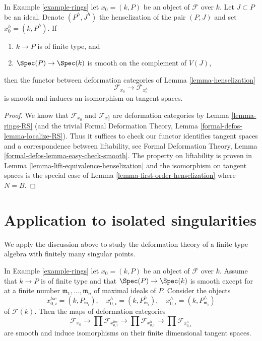 \begin{lemma}
\label{lemma-smooth-henselization}
In Example \ref{example-rings} let $x_0 = (k, P)$ be an object
of $\mathcal{F}$ over $k$. Let $J \subset P$ be an ideal.
Denote $(P^h, J^h)$ the henselization of the pair $(P, J)$ and set
$x_0^h = (k, P^h)$. If
\begin{enumerate}
\item $k \to P$ is of finite type, and
\item $\Spec(P) \to \Spec(k)$ is smooth on the complement of $V(J)$,
\end{enumerate}
then the functor between deformation categories of
Lemma \ref{lemma-henselization}
$$
\mathcal{F}_{x_0} \longrightarrow \mathcal{F}_{x_0^h}
$$
is smooth and induces an isomorphism on tangent spaces.
\end{lemma}

\begin{proof}
We know that $\mathcal{F}_{x_0}$ and $\mathcal{F}_{x_0^h}$
are deformation categories by Lemma \ref{lemma-rings-RS}
(and the trivial Formal Deformation Theory, Lemma
\ref{formal-defos-lemma-localize-RS}). Thus it suffices to check
our functor identifies tangent spaces and a correspondence
between liftability, see
Formal Deformation Theory, Lemma \ref{formal-defos-lemma-easy-check-smooth}.
The property on liftability is proven in
Lemma \ref{lemma-lift-equivalence-henselization}
and the isomorphism on tangent spaces is the special case of
Lemma \ref{lemma-first-order-henselization} where $N = B$.
\end{proof}



\section{Application to isolated singularities}
\label{section-isolated}

\noindent
We apply the discussion above to study the deformation theory
of a finite type algebra with finitely many singular points.

\begin{lemma}
\label{lemma-isolated}
In Example \ref{example-rings} let $x_0 = (k, P)$ be an object
of $\mathcal{F}$ over $k$. Assume that $k \to P$ is of finite type
and that $\Spec(P) \to \Spec(k)$ is smooth except for at a finite
number $\mathfrak m_1, \ldots, \mathfrak m_n$ of maximal ideals of $P$.
Consider the objects
$$
x_{0, i}^{loc} = (k, P_{\mathfrak m_i}),\quad
x_{0, i}^h = (k, P_{\mathfrak m_i}^h),\quad
x_{0, i}^\wedge = (k, P_{\mathfrak m_i}^\wedge)
$$
of $\mathcal{F}(k)$. Then the maps of deformation categories
$$
\mathcal{F}_{x_0} \to
\prod \mathcal{F}_{x_{0, i}^{loc}} \to
\prod \mathcal{F}_{x_{0, i}^h} \to
\prod \mathcal{F}_{x_{0, i}^\wedge}
$$
are smooth and induce isomorphisms on their finite dimensional
tangent spaces.
\end{lemma}

